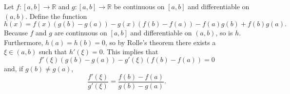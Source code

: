 \documentclass[12pt]{article}
\begin{document}
Let $f:[a,b]\to\mathbb{R}$ and $g:[a,b]\to\mathbb{R}$ be continuous on $[a,b]$ and differentiable on $(a,b)$.  Define the function
$$
h(x)=f(x)\left(g(b)-g(a)\right)-g(x)\left(f(b)-f(a)\right)-f(a)g(b)+f(b)g(a).
$$
Because $f$ and $g$ are continuous on $[a,b]$ and differentiable on $(a,b)$, so is $h$.  Furthermore, $h(a)=h(b)=0$, so by Rolle's theorem there exists a $\xi\in(a,b)$ such that $h'(\xi)=0$.  This implies that
$$
f'(\xi)\left(g(b)-g(a)\right)-g'(\xi)\left(f(b)-f(a)\right)=0
$$
and, if $g(b)\neq g(a)$,
$$
\frac{f'(\xi)}{g'(\xi)}=\frac{f(b)-f(a)}{g(b)-g(a)}.
$$
\end{document}
